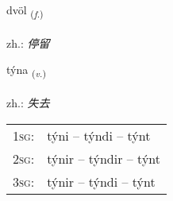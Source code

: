 \documentclass[frontgrid, backgrid]{flacards}\usepackage[]{graphicx}\usepackage[]{xcolor}
\begin{document}
\renewcommand{\flhead}{\vskip5pt \fboxsep=0pt {\small\bfseries\footnotesize Nafnorð | 名词}}
\renewcommand{\fcfoot}{\vskip5pt \fboxsep=0pt \hspace{2pt}{\small\bfseries\footnotesize 3K}}

\renewcommand{\blhead}{\vskip5pt {\small\bfseries\footnotesize Nafnorð | 名词 }}
\renewcommand{\bcfoot}{\vskip5pt \hspace{2pt}{\small\bfseries\footnotesize 3K}}


{dvöl \small{\textsubscript{(\textit{f.})}} \\[1ex] %
\textphonetic{[tvœːl]} \\
zh.: \emph{停留} \\  [2ex]
\renewcommand*{\arraystretch}{0.8}
}

\renewcommand{\flhead}{\vskip5pt \fboxsep=0pt {\small\bfseries\footnotesize Sagnorð | 动词}}
\renewcommand{\fcfoot}{\vskip5pt \fboxsep=0pt \hspace{2pt}{\small\bfseries\footnotesize 3K}}

\renewcommand{\blhead}{\vskip5pt {\small\bfseries\footnotesize Sagnorð | 动词 }}
\renewcommand{\bcfoot}{\vskip5pt \hspace{2pt}{\small\bfseries\footnotesize 3K}}


{týna \small{\textsubscript{(\textit{v.})}} \\[1ex] %
\textphonetic{[tʰiːna]} \\
zh.: \emph{失去} \\  [2ex]
\renewcommand*{\arraystretch}{0.8}
\begin{tabular}{p{1cm}l}
\textsc{1sg}: & týni -- týndi -- týnt \\ 
\textsc{2sg}: & týnir -- týndir -- týnt \\ 
\textsc{3sg}: & týnir -- týndi -- týnt \\ 
\end{tabular}
}
\end{document}
